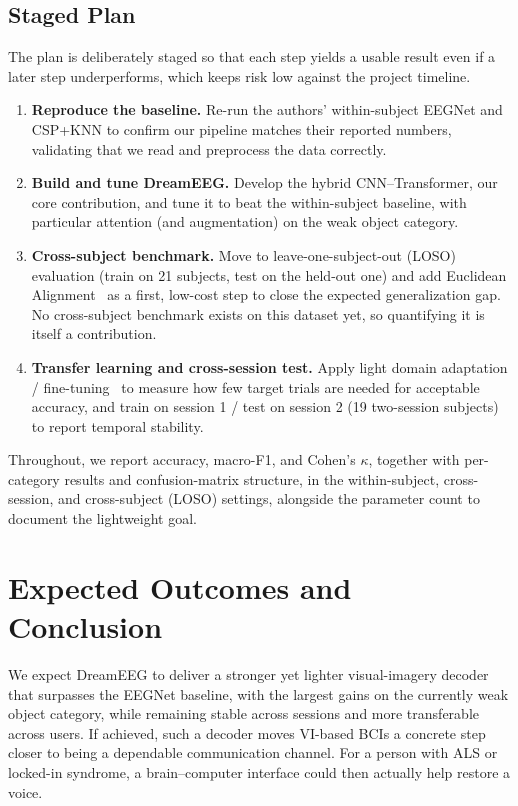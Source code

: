 \documentclass[conference]{IEEEtran}
\begin{document}
\subsection{Staged Plan}
The plan is deliberately staged so that each step yields a usable result even
if a later step underperforms, which keeps risk low against the project
timeline.
\begin{enumerate}
  \item \textbf{Reproduce the baseline.} Re-run the authors' within-subject
        EEGNet and CSP+KNN to confirm our pipeline matches their reported
        numbers, validating that we read and preprocess the data correctly.
  \item \textbf{Build and tune DreamEEG.} Develop the hybrid CNN--Transformer,
        our core contribution, and tune it to beat the within-subject
        baseline, with particular attention (and augmentation) on the weak
        object category.
  \item \textbf{Cross-subject benchmark.} Move to leave-one-subject-out
        (LOSO) evaluation (train on 21 subjects, test on the held-out one)
        and add Euclidean Alignment~\cite{junqueira2024} as a first,
        low-cost step to close the expected generalization gap. No
        cross-subject benchmark exists on this dataset yet, so quantifying it
        is itself a contribution.
  \item \textbf{Transfer learning and cross-session test.} Apply light
        domain adaptation / fine-tuning~\cite{wu2022} to measure how few
        target trials are needed for acceptable accuracy, and train on
        session 1 / test on session 2 (19 two-session subjects) to report
        temporal stability.
\end{enumerate}

Throughout, we report accuracy, macro-F1, and Cohen's $\kappa$, together with
per-category results and confusion-matrix structure, in the within-subject,
cross-session, and cross-subject (LOSO) settings, alongside the parameter
count to document the lightweight goal.

\section{Expected Outcomes and Conclusion}
We expect DreamEEG to deliver a stronger yet lighter visual-imagery decoder
that surpasses the EEGNet baseline, with the largest gains on the currently
weak object category, while remaining stable across sessions and more
transferable across users. If achieved, such a decoder moves VI-based BCIs a
concrete step closer to being a dependable communication channel. For a
person with ALS or locked-in syndrome, a brain--computer interface could then
actually help restore a voice.
\end{document}
